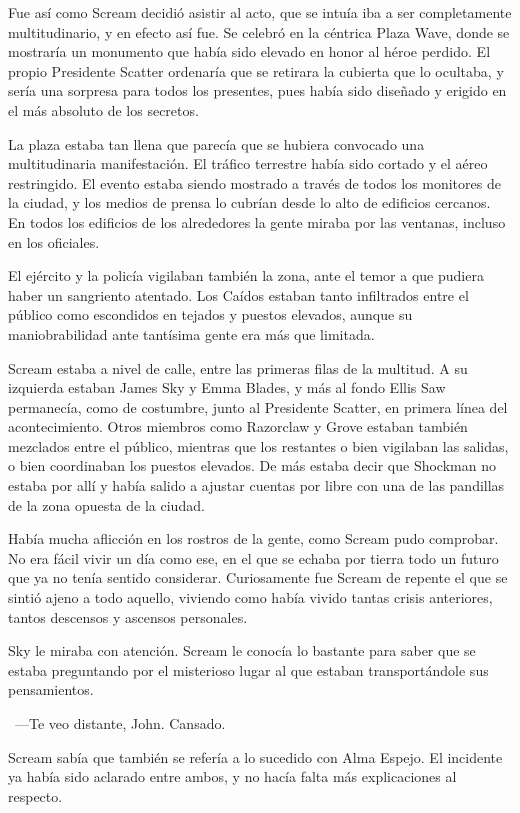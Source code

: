 Fue así como Scream decidió asistir al acto, que se intuía iba a ser completamente multitudinario, y en efecto así fue. Se celebró en la céntrica Plaza Wave, donde se mostraría un monumento que había sido elevado en honor al héroe perdido. El propio Presidente Scatter ordenaría que se retirara la cubierta que lo ocultaba, y sería una sorpresa para todos los presentes, pues había sido diseñado y erigido en el más absoluto de los secretos.

La plaza estaba tan llena que parecía que se hubiera convocado una multitudinaria manifestación. El tráfico terrestre había sido cortado y el aéreo restringido. El evento estaba siendo mostrado a través de todos los monitores de la ciudad, y los medios de prensa lo cubrían desde lo alto de edificios cercanos. En todos los edificios de los alrededores la gente miraba por las ventanas, incluso en los oficiales.

El ejército y la policía vigilaban también la zona, ante el temor a que pudiera haber un sangriento atentado. Los Caídos estaban tanto infiltrados entre el público como escondidos en tejados y puestos elevados, aunque su maniobrabilidad ante tantísima gente era más que limitada.

Scream estaba a nivel de calle, entre las primeras filas de la multitud. A su izquierda estaban James Sky y Emma Blades, y más al fondo Ellis Saw permanecía, como de costumbre, junto al Presidente Scatter, en primera línea del acontecimiento. Otros miembros como Razorclaw y Grove estaban también mezclados entre el público, mientras que los restantes o bien vigilaban las salidas, o bien coordinaban los puestos elevados. De más estaba decir que Shockman no estaba por allí y había salido a ajustar cuentas por libre con una de las pandillas de la zona opuesta de la ciudad.

Había mucha aflicción en los rostros de la gente, como Scream pudo comprobar. No era fácil vivir un día como ese, en el que se echaba por tierra todo un futuro que ya no tenía sentido considerar. Curiosamente fue Scream de repente el que se sintió ajeno a todo aquello, viviendo como había vivido tantas crisis anteriores, tantos descensos y ascensos personales.

Sky le miraba con atención. Scream le conocía lo bastante para saber que se estaba preguntando por el misterioso lugar al que estaban transportándole sus pensamientos.

~---Te veo distante, John. Cansado.

Scream sabía que también se refería a lo sucedido con Alma Espejo. El incidente ya había sido aclarado entre ambos, y no hacía falta más explicaciones al respecto.

